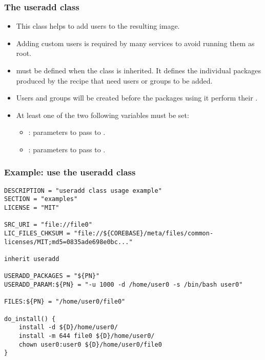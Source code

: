 \begin{frame}
  \frametitle{The useradd class}
  \begin{itemize}
    \item This class helps to add users to the resulting image.
    \item Adding custom users is required by many services to avoid
          running them as root.
    \item {} must be defined when the  class
          is inherited. It defines the individual packages produced by the
          recipe that need users or groups to be added.
    \item Users and groups will be created before the packages using
          it perform their .
    \item At least one of the two following variables must be set:
    \begin{itemize}
      \item {}: parameters to pass to
            .
      \item {}: parameters to pass to
            .
    \end{itemize}
  \end{itemize}
\end{frame}

\begin{frame}[fragile]
  \frametitle{Example: use the useradd class}
  \begin{block}{}
    \begin{verbatim}
DESCRIPTION = "useradd class usage example"
SECTION = "examples"
LICENSE = "MIT"

SRC_URI = "file://file0"
LIC_FILES_CHKSUM = "file://${COREBASE}/meta/files/common-licenses/MIT;md5=0835ade698e0bc..."

inherit useradd

USERADD_PACKAGES = "${PN}"
USERADD_PARAM:${PN} = "-u 1000 -d /home/user0 -s /bin/bash user0"

FILES:${PN} = "/home/user0/file0"

do_install() {
    install -d ${D}/home/user0/
    install -m 644 file0 ${D}/home/user0/
    chown user0:user0 ${D}/home/user0/file0
}
    \end{verbatim}
  \end{block}
\end{frame}

